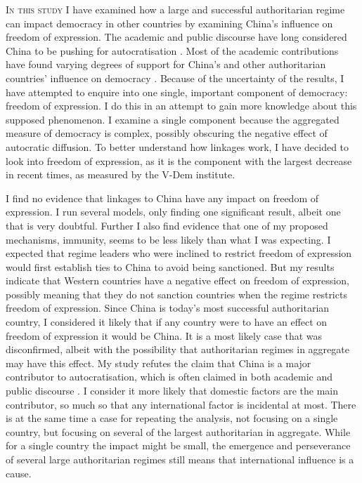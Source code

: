 \lettrine{I}{n this study} I have examined how a large and successful authoritarian regime can impact democracy in other countries by examining China's influence on freedom of expression. The academic and public discourse have long considered China to be pushing for autocratisation \citep{jintao_chinas_2023, biden_remarks_2021, economy_exporting_2020, repucci_global_2022, repucci_authoritarians_2022}. Most of the academic contributions have found varying degrees of support for China's and other authoritarian countries' influence on democracy \citep{loughlin_chinese_2021, risse_democracy_2015, tansey_ties_2017, weyland_autocratic_2017, wong_chinese_2019}. Because of the uncertainty of the results, I have attempted to enquire into one single, important component of democracy: freedom of expression. I do this in an attempt to gain more knowledge about this supposed phenomenon. I examine a single component because the aggregated measure of democracy is complex, possibly obscuring the negative effect of autocratic diffusion. To better understand how linkages work, I have decided to look into freedom of expression, as it is the component with the largest decrease in recent times, as measured by the V-Dem institute.

I find no evidence that linkages to China have any impact on freedom of expression. I run several models, only finding one significant result, albeit one that is very doubtful. Further I also find evidence that one of my proposed mechanisms, immunity, seems to be less likely than what I was expecting. I expected that regime leaders who were inclined to restrict freedom of expression would first establish ties to China to avoid being sanctioned. But my results indicate that Western countries have a negative effect on freedom of expression, possibly meaning that they do not sanction countries when the regime restricts freedom of expression. Since China is today's most successful authoritarian country, I considered it likely that if any country were to have an effect on freedom of expression it would be China. It is a most likely case that was disconfirmed, albeit with the possibility that authoritarian regimes in aggregate may have this effect. My study refutes the claim that China is a major contributor to autocratisation, which is often claimed in both academic and public discourse \citep{jintao_chinas_2023, biden_remarks_2021, economy_exporting_2020, repucci_global_2022, repucci_authoritarians_2022}. I consider it more likely that domestic factors are the main contributor, so much so that any international factor is incidental at most. There is at the same time a case for repeating the analysis, not focusing on a single country, but focusing on several of the largest authoritarian in aggregate. While for a single country the impact might be small, the emergence and perseverance of several large authoritarian regimes still means that international influence is a cause.


